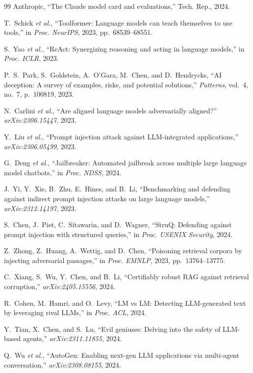 \documentclass[journal,twoside]{IEEEtran}
\begin{document}
\begin{thebibliography}{99}
{Anthropic}, ``The Claude model card and evaluations,'' Tech. Rep., 2024.

T.~Schick \emph{et al.}, ``Toolformer: Language models can teach themselves to use tools,'' in \emph{Proc. NeurIPS}, 2023, pp.~68539--68551.

S.~Yao \emph{et al.}, ``ReAct: Synergizing reasoning and acting in language models,'' in \emph{Proc. ICLR}, 2023.

P.~S.~Park, S.~Goldstein, A.~O'Gara, M.~Chen, and D.~Hendrycks, ``AI deception: A survey of examples, risks, and potential solutions,'' \emph{Patterns}, vol.~4, no.~7, p.~100819, 2023.

N.~Carlini \emph{et al.}, ``Are aligned language models adversarially aligned?'' \emph{arXiv:2306.15447}, 2023.

Y.~Liu \emph{et al.}, ``Prompt injection attack against LLM-integrated applications,'' \emph{arXiv:2306.05499}, 2023.

G.~Deng \emph{et al.}, ``Jailbreaker: Automated jailbreak across multiple large language model chatbots,'' in \emph{Proc. NDSS}, 2024.

J.~Yi, Y.~Xie, B.~Zhu, E.~Hines, and B.~Li, ``Benchmarking and defending against indirect prompt injection attacks on large language models,'' \emph{arXiv:2312.14197}, 2023.

S.~Chen, J.~Piet, C.~Sitawarin, and D.~Wagner, ``StruQ: Defending against prompt injection with structured queries,'' in \emph{Proc. USENIX Security}, 2024.

Z.~Zhong, Z.~Huang, A.~Wettig, and D.~Chen, ``Poisoning retrieval corpora by injecting adversarial passages,'' in \emph{Proc. EMNLP}, 2023, pp.~13764--13775.

C.~Xiang, S.~Wu, Y.~Chen, and B.~Li, ``Certifiably robust RAG against retrieval corruption,'' \emph{arXiv:2405.15556}, 2024.

R.~Cohen, M.~Hamri, and O.~Levy, ``LM vs LM: Detecting LLM-generated text by leveraging rival LLMs,'' in \emph{Proc. ACL}, 2024.

Y.~Tian, X.~Chen, and S.~Lu, ``Evil geniuses: Delving into the safety of LLM-based agents,'' \emph{arXiv:2311.11855}, 2024.

Q.~Wu \emph{et al.}, ``AutoGen: Enabling next-gen LLM applications via multi-agent conversation,'' \emph{arXiv:2308.08155}, 2024.


\end{thebibliography}
\end{document}
